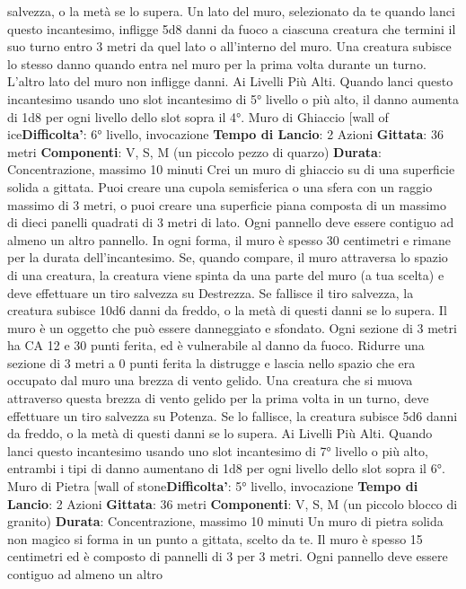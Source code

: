 \begin{multicols}{2}
salvezza, o la metà se lo supera.
Un lato del muro, selezionato da te quando lanci questo
incantesimo, infligge 5d8 danni da fuoco a ciascuna
creatura che termini il suo turno entro 3 metri da quel
lato o all’interno del muro. Una creatura subisce lo
stesso danno quando entra nel muro per la prima volta
durante un turno. L’altro lato del muro non infligge
danni.
Ai Livelli Più Alti. Quando lanci questo incantesimo
usando uno slot incantesimo di 5° livello o più alto, il
danno aumenta di 1d8 per ogni livello dello slot sopra il
4°.
Muro di Ghiaccio
[wall of ice\textbf{Difficolta'}:
6° livello, invocazione
\textbf{Tempo di Lancio}: 2 Azioni
\textbf{Gittata}: 36 metri
\textbf{Componenti}: V, S, M (un piccolo pezzo di quarzo)
\textbf{Durata}: Concentrazione, massimo 10 minuti
Crei un muro di ghiaccio su di una superficie solida a
gittata. Puoi creare una cupola semisferica o una sfera
con un raggio massimo di 3 metri, o puoi creare una
superficie piana composta di un massimo di dieci
panelli quadrati di 3 metri di lato. Ogni pannello deve
essere contiguo ad almeno un altro pannello. In ogni
forma, il muro è spesso 30 centimetri e rimane per la
durata dell’incantesimo.
Se, quando compare, il muro attraversa lo spazio di una
creatura, la creatura viene spinta da una parte del muro
(a tua scelta) e deve effettuare un tiro salvezza su
Destrezza. Se fallisce il tiro salvezza, la creatura
subisce 10d6 danni da freddo, o la metà di questi danni
se lo supera.
Il muro è un oggetto che può essere danneggiato e
sfondato. Ogni sezione di 3 metri ha CA 12 e 30 punti
ferita, ed è vulnerabile al danno da fuoco. Ridurre una
sezione di 3 metri a 0 punti ferita la distrugge e lascia
nello spazio che era occupato dal muro una brezza di
vento gelido. Una creatura che si muova attraverso
questa brezza di vento gelido per la prima volta in un
turno, deve effettuare un tiro salvezza su Potenza.
Se lo fallisce, la creatura subisce 5d6 danni da freddo,
o la metà di questi danni se lo supera.
Ai Livelli Più Alti. Quando lanci questo incantesimo
usando uno slot incantesimo di 7° livello o più alto,
entrambi i tipi di danno aumentano di 1d8 per ogni
livello dello slot sopra il 6°.
Muro di Pietra
[wall of stone\textbf{Difficolta'}:
5° livello, invocazione
\textbf{Tempo di Lancio}: 2 Azioni
\textbf{Gittata}: 36 metri
\textbf{Componenti}: V, S, M (un piccolo blocco di granito)
\textbf{Durata}: Concentrazione, massimo 10 minuti
Un muro di pietra solida non magico si forma in un
punto a gittata, scelto da te. Il muro è spesso 15
centimetri ed è composto di pannelli di 3 per 3 metri.
Ogni pannello deve essere contiguo ad almeno un altro

\end{multicols}
